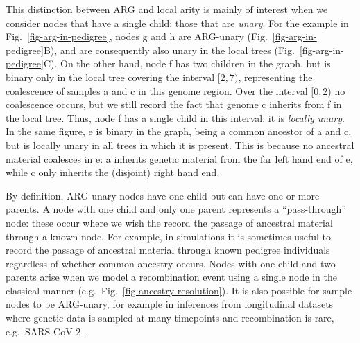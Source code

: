 \documentclass{article}
\newcommand{\noderef}[1]{\textsf{#1}}
\begin{document}
This distinction between ARG and local arity is mainly
of interest when we consider nodes that have
a single child: those that are \emph{unary}.
For the example in Fig.~\ref{fig-arg-in-pedigree}, nodes
\noderef{g} and \noderef{h}
are ARG-unary (Fig.~\ref{fig-arg-in-pedigree}B), and are consequently
also unary in the local trees (Fig.~\ref{fig-arg-in-pedigree}C).
On the other hand, node \noderef{f} has two children
in the graph, but is binary only
in the local tree covering the interval $[2, 7)$,
representing the coalescence of samples \noderef{a} and \noderef{c}
in this genome region. Over the interval $[0, 2)$ no coalescence occurs,
but we still record the fact that genome \noderef{c} inherits from \noderef{f}
in the local tree. Thus, node \noderef{f} has a single child in this
interval: it is \emph{locally unary}.
In the same figure, \noderef{e} is binary in the graph, being a common
ancestor of \noderef{a} and \noderef{c}, but is
locally unary in all trees in which it is present.
This is because no ancestral material coalesces in \noderef{e}:
\noderef{a} inherits genetic material from the far left hand end of
\noderef{e},
while \noderef{c} only inherits the (disjoint) right hand end.

By definition, ARG-unary nodes have one child but can have one or
more parents.
A node with one child and only one parent represents a ``pass-through'' node:
these occur where we wish the record the passage of ancestral material
through a known node. For example, in simulations
it is sometimes useful to record the passage of
ancestral material through known pedigree individuals
regardless of whether common ancestry occurs.
Nodes with one child and two parents arise when
we model a recombination event using a single node
in the classical manner
(e.g.\ Fig.~\ref{fig-ancestry-resolution}).
It is also possible for sample nodes to be ARG-unary, for example
in inferences from longitudinal datasets where genetic
data is sampled at many timepoints and recombination
is rare, e.g.~SARS-CoV-2~\citep{zhan2023towards}.
\end{document}
